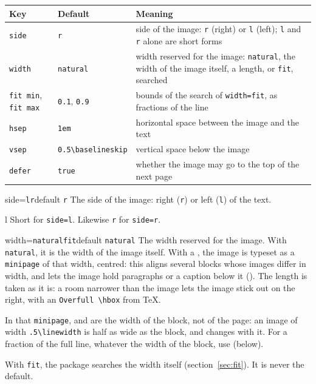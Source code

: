 \documentclass[a4paper,11pt]{article}
\newcommand\key[1]{\texttt{#1}}
\providecommand\env[1]{\texttt{#1}}
\begin{document}
\begin{center}
\begin{tabularx}{\linewidth}{@{}llX@{}}
\toprule
Key & Default & Meaning \\
\midrule
\key{side} & \texttt{r} & side of the image: \texttt{r} (right) or \texttt{l} (left); \key{l} and \key{r} alone are short forms \\
\key{width} & \texttt{natural} & width reserved for the image: \texttt{natural}, the width of the image itself, a length, or \texttt{fit}, searched \\
\key{fit min}, \key{fit max} & \texttt{0.1}, \texttt{0.9} & bounds of the search of \key{width=fit}, as fractions of the line \\
\key{hsep} & \texttt{1em} & horizontal space between the image and the text \\
\key{vsep} & \texttt{0.5\textbackslash baselineskip} & vertical space below the image \\
\key{defer} & \texttt{true} & whether the image may go to the top of the next page \\
\bottomrule
\end{tabularx}
\end{center}

\begin{docKey}[wrapblock]{side}{=\texttt{l}\textbar\texttt{r}}{default \texttt{r}}
  The side of the image: right (\key{r}) or left (\key{l}) of the text.
\end{docKey}

\begin{docKey}[wrapblock]{l}{}{}
  Short for \key{side=l}. Likewise \key{r} for \key{side=r}.
\end{docKey}

\begin{docKey}[wrapblock]{width}{=\texttt{natural}\textbar{}\textbar\texttt{fit}}{default \texttt{natural}}
  The width reserved for the image. With \texttt{natural}, it is the width of the image itself. With a , the image is typeset as a \env{minipage} of that width, centred: this aligns several blocks whose images differ in width, and lets the image hold paragraphs or a caption below it (). The length is taken as it is: a room narrower than the image lets the image stick out on the right, with an \texttt{Overfull \textbackslash hbox} from \TeX{}.

  In that \env{minipage},  and  are the width of the block, not of the page: an image of width \texttt{.5\textbackslash linewidth} is half as wide as the block, and changes with it. For a fraction of the full line, whatever the width of the block, use  (below).

  With \texttt{fit}, the package searches the width itself (section~\ref{sec:fit}). It is never the default.
\end{docKey}
\end{document}
